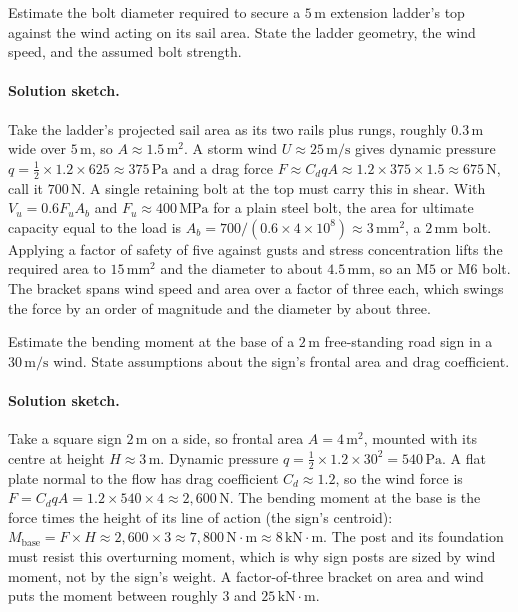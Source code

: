 \begin{exercise}
Estimate the bolt diameter required to secure a $5\,\si{\meter}$
extension ladder's top against the wind acting on its sail area.
State the ladder geometry, the wind speed, and the assumed bolt
strength.

\paragraph{Solution sketch.} Take the ladder's projected sail area as
its two rails plus rungs, roughly $0.3\,\si{\meter}$ wide over
$5\,\si{\meter}$, so $A \approx 1.5\,\si{\meter\squared}$. A storm wind
$U \approx 25\,\si{\meter\per\second}$ gives dynamic pressure
$q = \tfrac12 \times 1.2 \times 625 \approx 375\,\text{Pa}$ and a drag
force $F \approx C_d q A \approx 1.2 \times 375 \times 1.5 \approx
675\,\text{N}$, call it $700\,\text{N}$. A single retaining bolt at the
top must carry this in shear. With $V_u = 0.6 F_u A_b$ and
$F_u \approx 400\,\text{MPa}$ for a plain steel bolt, the area for
ultimate capacity equal to the load is
$A_b = 700/(0.6 \times 4 \times 10^{8}) \approx 3\,\si{\milli\meter
\squared}$, a $2\,\si{\milli\meter}$ bolt. Applying a factor of safety
of five against gusts and stress concentration lifts the required area
to $15\,\si{\milli\meter\squared}$ and the diameter to about
$4.5\,\si{\milli\meter}$, so an $\text{M5}$ or $\text{M6}$ bolt. The
bracket spans wind speed and area over a factor of three each, which
swings the force by an order of magnitude and the diameter by about
three.
\end{exercise}

\begin{exercise}
Estimate the bending moment at the base of a $2\,\si{\meter}$
free-standing road sign in a $30\,\si{\meter\per\second}$ wind.
State assumptions about the sign's frontal area and drag
coefficient.

\paragraph{Solution sketch.} Take a square sign $2\,\si{\meter}$ on a
side, so frontal area $A = 4\,\si{\meter\squared}$, mounted with its
centre at height $H \approx 3\,\si{\meter}$. Dynamic pressure
$q = \tfrac12 \times 1.2 \times 30^2 = 540\,\text{Pa}$. A flat plate
normal to the flow has drag coefficient $C_d \approx 1.2$, so the wind
force is $F = C_d q A = 1.2 \times 540 \times 4 \approx 2{,}600\,
\text{N}$. The bending moment at the base is the force times the height
of its line of action (the sign's centroid):
$M_{\text{base}} = F \times H \approx 2{,}600 \times 3 \approx
7{,}800\,\text{N}\cdot\text{m} \approx 8\,\text{kN}\cdot\text{m}$. The
post and its foundation must resist this overturning moment, which is
why sign posts are sized by wind moment, not by the sign's weight. A
factor-of-three bracket on area and wind puts the moment between roughly
$3$ and $25\,\text{kN}\cdot\text{m}$.
\end{exercise}

